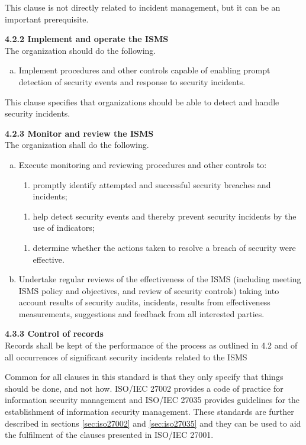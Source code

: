 This clause is not directly related to incident management, but it can be an important prerequisite. %

\textbf{4.2.2 Implement and operate the \ac{ISMS}} \\
The organization should do the following.
\begin{enumerate}[h)]
\item Implement procedures and other controls capable of enabling prompt detection of security events and response to security incidents.
\end{enumerate}

This clause specifies that organizations should be able to detect and handle security incidents.

\textbf{4.2.3 Monitor and review the ISMS}\\
The organization shall do the following.
\begin{enumerate}[a)]
\item Execute monitoring and reviewing procedures and other controls to:
\begin{enumerate}[2)]
\item promptly identify attempted and successful security breaches and incidents;
\end{enumerate}
\vspace{-0.2cm}
\begin{enumerate}[4)]
\item help detect security events and thereby prevent security incidents by the use of indicators;
\end{enumerate}
\vspace{-0.2cm}
\begin{enumerate}[5)]
\item determine whether the actions taken to resolve a breach of security were effective.
\end{enumerate}
\item Undertake regular reviews of the effectiveness of the \ac{ISMS} (including meeting \ac{ISMS} policy and objectives, and review of security controls) taking into account results of security audits, incidents, results from effectiveness measurements, suggestions and feedback from all interested parties.
\end{enumerate}

\textbf{4.3.3 Control of records}\\
Records shall be kept of the performance of the process as outlined in 4.2 and of all occurrences of significant security incidents related to the \ac{ISMS}

Common for all clauses in this standard is that they only specify that things should be done, and not how. \acs{ISO}/\acs{IEC} 27002 provides a code of practice for information security management and \acs{ISO}/\acs{IEC} 27035 provides guidelines for the establishment of information security management. These standards are further described in sections \ref{sec:iso27002} and \ref{sec:iso27035} and they can be used to aid the fulfilment of the clauses presented in \acs{ISO}/\acs{IEC} 27001.